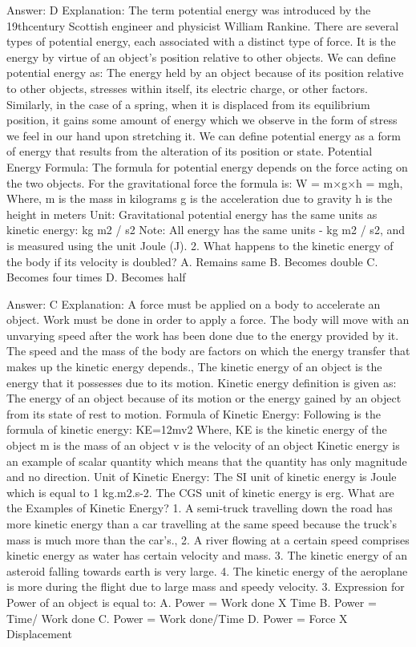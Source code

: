 Answer: D
Explanation: The term potential energy was introduced by the 19thcentury Scottish engineer and physicist William Rankine. There are several types of potential energy, each associated with a distinct type of force. It is the energy by virtue of an object’s position relative to other objects. We can define potential energy as: The energy held by an object because of its position relative to other objects, stresses within itself, its electric charge, or other factors. Similarly, in the case of a spring, when it is displaced from its equilibrium position, it gains some amount of energy which we observe in the form of stress we feel in our hand upon stretching it. We can define potential energy as a form of energy that results from the alteration of its position or state. Potential Energy Formula: The formula for potential energy depends on the force acting on the two objects. For the gravitational force the formula is: W = m×g×h = mgh,  Where, m is the mass in kilograms g is the acceleration due to gravity h is the height in meters Unit: Gravitational potential energy has the same units as kinetic energy: kg m2 / s2 Note: All energy has the same units - kg m2 / s2, and is measured using the unit Joule (J). 2. What happens to the kinetic energy of the body if its velocity is doubled? A. Remains same B. Becomes double C. Becomes four times D. Becomes half 

Answer: C
Explanation: A force must be applied on a body to accelerate an object. Work must be done in order to apply a force. The body will move with an unvarying speed after the work has been done due to the energy provided by it. The speed and the mass of the body are factors on which the energy transfer that makes up the kinetic energy depends.,  The kinetic energy of an object is the energy that it possesses due to its motion. Kinetic energy definition is given as: The energy of an object because of its motion or the energy gained by an object from its state of rest to motion. Formula of Kinetic Energy: Following is the formula of kinetic energy: KE=12mv2 Where, KE is the kinetic energy of the object m is the mass of an object v is the velocity of an object Kinetic energy is an example of scalar quantity which means that the quantity has only magnitude and no direction. Unit of Kinetic Energy: The SI unit of kinetic energy is Joule which is equal to 1 kg.m2.s-2. The CGS unit of kinetic energy is erg. What are the Examples of Kinetic Energy? 1. A semi-truck travelling down the road has more kinetic energy than a car travelling at the same speed because the truck’s mass is much more than the car’s.,  2. A river flowing at a certain speed comprises kinetic energy as water has certain velocity and mass. 3. The kinetic energy of an asteroid falling towards earth is very large. 4. The kinetic energy of the aeroplane is more during the flight due to large mass and speedy velocity. 3. Expression for Power of an object is equal to: A. Power = Work done X Time B. Power = Time/ Work done C. Power = Work done/Time D. Power = Force X Displacement 


